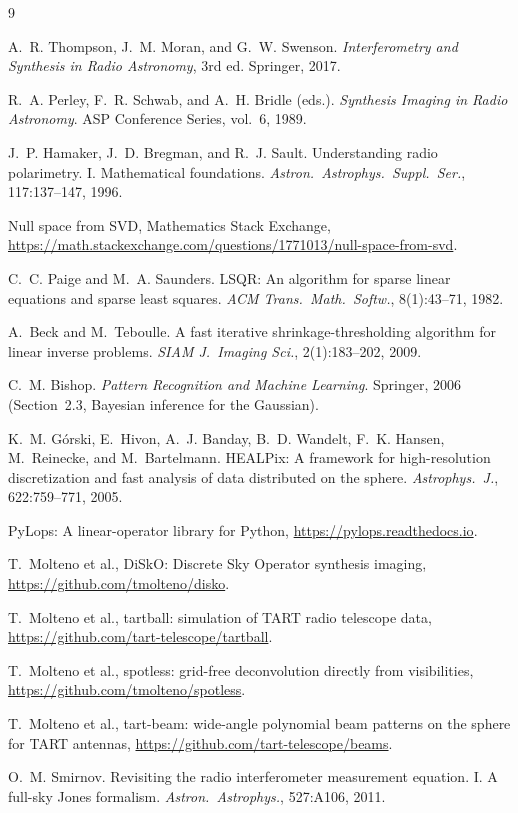 \documentclass[11pt,a4paper]{article}
\begin{document}
\begin{thebibliography}{9}

A.~R. Thompson, J.~M. Moran, and G.~W. Swenson.
\emph{Interferometry and Synthesis in Radio Astronomy}, 3rd ed.
Springer, 2017.

R.~A. Perley, F.~R. Schwab, and A.~H. Bridle (eds.).
\emph{Synthesis Imaging in Radio Astronomy}.
ASP Conference Series, vol.~6, 1989.

J.~P. Hamaker, J.~D. Bregman, and R.~J. Sault.
Understanding radio polarimetry. I. Mathematical foundations.
\emph{Astron.\ Astrophys.\ Suppl.\ Ser.}, 117:137--147, 1996.

Null space from SVD, Mathematics Stack Exchange,
\url{https://math.stackexchange.com/questions/1771013/null-space-from-svd}.

C.~C. Paige and M.~A. Saunders.
LSQR: An algorithm for sparse linear equations and sparse least squares.
\emph{ACM Trans.\ Math.\ Softw.}, 8(1):43--71, 1982.

A.~Beck and M.~Teboulle.
A fast iterative shrinkage-thresholding algorithm for linear inverse problems.
\emph{SIAM J.\ Imaging Sci.}, 2(1):183--202, 2009.

C.~M. Bishop.
\emph{Pattern Recognition and Machine Learning}.
Springer, 2006 (Section~2.3, Bayesian inference for the Gaussian).

K.~M. G\'orski, E.~Hivon, A.~J. Banday, B.~D. Wandelt, F.~K. Hansen,
M.~Reinecke, and M.~Bartelmann.
HEALPix: A framework for high-resolution discretization and fast analysis of
data distributed on the sphere.
\emph{Astrophys.\ J.}, 622:759--771, 2005.

PyLops: A linear-operator library for Python,
\url{https://pylops.readthedocs.io}.

T.~Molteno et al., DiSkO: Discrete Sky Operator synthesis imaging,
\url{https://github.com/tmolteno/disko}.

T.~Molteno et al., tartball: simulation of TART radio telescope data,
\url{https://github.com/tart-telescope/tartball}.

T.~Molteno et al., spotless: grid-free deconvolution directly from
visibilities,
\url{https://github.com/tmolteno/spotless}.

T.~Molteno et al., tart-beam: wide-angle polynomial beam patterns on the
sphere for TART antennas,
\url{https://github.com/tart-telescope/beams}.

O.~M. Smirnov.
Revisiting the radio interferometer measurement equation. I. A full-sky Jones
formalism.
\emph{Astron.\ Astrophys.}, 527:A106, 2011.

\end{thebibliography}
\end{document}
